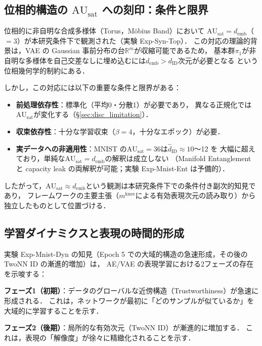 \documentclass[11pt,a4paper]{jsarticle}
\newcommand{\dID}{d_{\mathrm{ID}}}
\newcommand{\R}{\mathbb{R}}
\newcommand{\AUsat}{\mathrm{AU}_{\mathrm{sat}}}
\newcommand{\mknee}{m^{\mathrm{knee}}}
\newcommand{\demb}{d_{\mathrm{emb}}}
\begin{document}
\subsection{位相的構造の $\AUsat$ への刻印：条件と限界}\label{sec:disc_topology}

位相的に非自明な合成多様体（Torus，Möbius Band）において
$\AUsat = \demb$（$= 3$）が本研究条件下で観測された（実験 Exp-Syn-Top）．
この対応の理論的背景は，VAE の Gaussian 事前分布の台$\R^m$が収縮可能であるため，
基本群$\pi_1$が非自明な多様体を自己交差なしに埋め込むには$\demb > \dID$次元が必要となる
という位相幾何学的制約\cite{hatcher2002algebraic,guillemin1974differential}にある．

しかし，この対応には以下の重要な条件と限界がある：
\begin{itemize}
  \item \textbf{前処理依存性}：標準化（平均0・分散1）が必要であり，
        異なる正規化では$\AUsat$が変化する（§\ref{sec:disc_limitation}）．
  \item \textbf{収束依存性}：十分な学習収束（$\beta = 4$，十分なエポック）が必要．
  \item \textbf{実データへの非適用性}：MNIST の$\AUsat = 36$は$\hat{d}_\mathrm{ID} \approx 10$〜12 を
        大幅に超えており，単純な$\AUsat = \demb$の解釈は成立しない
        （Manifold Entanglement と capacity leak の両解釈が可能；実験 Exp-Mnist-Ent は予備的）．
\end{itemize}

したがって，$\AUsat \approx \demb$という観測は本研究条件下での条件付き副次的知見であり，
フレームワークの主要主張（$\mknee$による有効表現次元の読み取り）から独立したものとして位置づける．

\subsection{学習ダイナミクスと表現の時間的形成}\label{sec:disc_dynamics}

実験 Exp-Mnist-Dyn の知見（Epoch 5 での大域的構造の急速形成，その後の TwoNN ID の漸進的増加）は，
AE/VAE の表現学習における2フェーズの存在を示唆する：

\textbf{フェーズ1（初期）}：データのグローバルな近傍構造（Trustworthiness）が急速に形成される．
これは，ネットワークが最初に「どのサンプルが似ているか」を大域的に学習することを示す．

\textbf{フェーズ2（後期）}：局所的な有効次元（TwoNN ID）が漸進的に増加する．
これは，表現の「解像度」が徐々に精緻化されることを示す．
\end{document}
